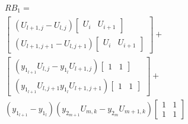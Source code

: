 \documentclass[11pt]{article} %
\begin{document}
\begin{itemize}
\begin{align}\label{RB1general}
\begin{split}
& RB_1 = \\
& \left[\begin{array}{r}
\left(U_{l+1,j}-U_{l,j}\right) \left[\begin{array}{cc} 
U_{i} & U_{i+1} 
\end{array}\right] \\
\left(U_{l+1,j+1}-U_{l,j+1}\right)\left[\begin{array}{cc} 
U_{i} & U_{i+1} 
\end{array}\right] 
\end{array}\right] + \\
&\left[\begin{array}{r} \left(y_{1_{l+1}}U_{l,j}-y_{1_{l}}U_{l+1,j}\right)\left[\begin{array}{cc} 1 & 1 \end{array}\right] \\ 
\left(y_{1_{l+1}}U_{l,j+1} y_{1_{l}}U_{l+1,j+1}\right)\left[\begin{array}{cc} 1 & 1 \end{array}\right] \end{array}\right]+ \\
& \left(y_{1_{l+1}}-y_{1_{l}}\right)\left(y_{2_{m+1}}U_{m,k}-y_{2_{m}}U_{m+1,k}\right)
\left[ \begin{array}{cc}
1 & 1 \\
1 & 1 \end{array}\right]
\end{split}
\end{align}


\end{itemize}
\end{document}

